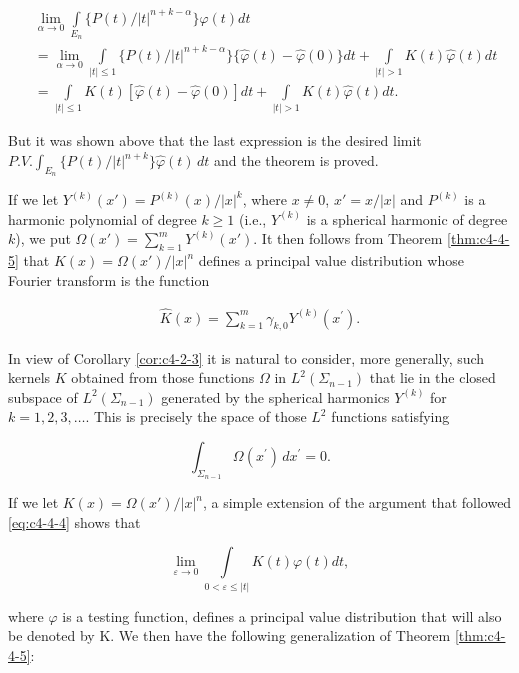 \[
\begin{aligned}&\lim_{\alpha\to0}\int\limits_{E_{n}}\{P(t)/|t|^{n+k-\alpha}\}\hat{\varphi}(t)dt\\
&=\lim_{\alpha\to0}\int\limits_{|t|\leq1}\{P(t)/|t|^{n+k-\alpha}\}\{\hat{\varphi}(t)-\hat{\varphi}(0)\}dt+\int\limits_{|t|>1}K(t)\hat{\varphi}(t)dt\\
&=\int\limits_{|t|\leq1}K(t)[\hat{\varphi}(t)-\hat{\varphi}(0)]dt+\int\limits_{|t|>1}K(t)\hat{\varphi}(t)dt.\end{aligned}
\]

But it was shown above that the last expression is the desired limit $P.V. \int_{E_n} \{P(t)/|t|^{n+k}\}\hat{\varphi}(t) \, dt$ and the theorem is proved.

If we let $Y^{(k)}(x') = P^{(k)}(x)/|x|^k$, where $x \neq 0$, $x' = x/|x|$ and $P^{(k)}$ is a harmonic polynomial of degree $k \geq 1$ (i.e., $Y^{(k)}$ is a spherical harmonic of degree $k$), we put $\Omega(x') = \sum_{k=1}^{m} Y^{(k)}(x')$. It then follows from Theorem \ref{thm:c4-4-5} that $K(x) = \Omega(x')/|x|^n$ defines a principal value distribution whose Fourier transform is the function

\[
\begin{array}{r}{\hat{K}(x)=\displaystyle\sum_{k=1}^{m}\gamma_{k,0}Y^{(k)}(x^{\prime}).}\end{array}
\]

In view of Corollary \ref{cor:c4-2-3} it is natural to consider, more generally, such kernels $K$ obtained from those functions $\Omega$ in $L^2(\Sigma_{n-1})$ that lie in the closed subspace of $L^2(\Sigma_{n-1})$ generated by the spherical harmonics $Y^{(k)}$ for $k=1,2,3,\ldots$. This is precisely the space of those $L^2$ functions satisfying

\begin{equation}\label{eq:c4-4-6}
\int_{\Sigma_{n-1}}\Omega(x^{\prime})\,dx^{\prime}=0.
\end{equation}

If we let $K(x) = \Omega(x')/|x|^n$, a simple extension of the argument that followed \eqref{eq:c4-4-4} shows that

\[
\lim_{\varepsilon\to0}\int\limits_{0<\varepsilon\leq|t|}K(t)\varphi(t)dt,
\]

where $\varphi$ is a testing function, defines a principal value distribution that will also be denoted by K. We then have the following generalization of Theorem \ref{thm:c4-4-5}:


